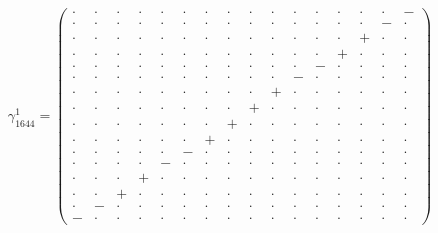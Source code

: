 \documentclass[
  10pt,
]{article}
\begin{document}
\[\gamma_{1644}^1=\left(\begin{smallmatrix} \cdot & \cdot & \cdot & \cdot & \cdot & \cdot & \cdot & \cdot & \cdot & \cdot & \cdot & \cdot & \cdot & \cdot & \cdot & - \\ \cdot & \cdot & \cdot & \cdot & \cdot & \cdot & \cdot & \cdot & \cdot & \cdot & \cdot & \cdot & \cdot & \cdot & - & \cdot \\ \cdot & \cdot & \cdot & \cdot & \cdot & \cdot & \cdot & \cdot & \cdot & \cdot & \cdot & \cdot & \cdot & + & \cdot & \cdot \\ \cdot & \cdot & \cdot & \cdot & \cdot & \cdot & \cdot & \cdot & \cdot & \cdot & \cdot & \cdot & + & \cdot & \cdot & \cdot \\ \cdot & \cdot & \cdot & \cdot & \cdot & \cdot & \cdot & \cdot & \cdot & \cdot & \cdot & - & \cdot & \cdot & \cdot & \cdot \\ \cdot & \cdot & \cdot & \cdot & \cdot & \cdot & \cdot & \cdot & \cdot & \cdot & - & \cdot & \cdot & \cdot & \cdot & \cdot \\ \cdot & \cdot & \cdot & \cdot & \cdot & \cdot & \cdot & \cdot & \cdot & + & \cdot & \cdot & \cdot & \cdot & \cdot & \cdot \\ \cdot & \cdot & \cdot & \cdot & \cdot & \cdot & \cdot & \cdot & + & \cdot & \cdot & \cdot & \cdot & \cdot & \cdot & \cdot \\ \cdot & \cdot & \cdot & \cdot & \cdot & \cdot & \cdot & + & \cdot & \cdot & \cdot & \cdot & \cdot & \cdot & \cdot & \cdot \\ \cdot & \cdot & \cdot & \cdot & \cdot & \cdot & + & \cdot & \cdot & \cdot & \cdot & \cdot & \cdot & \cdot & \cdot & \cdot \\ \cdot & \cdot & \cdot & \cdot & \cdot & - & \cdot & \cdot & \cdot & \cdot & \cdot & \cdot & \cdot & \cdot & \cdot & \cdot \\ \cdot & \cdot & \cdot & \cdot & - & \cdot & \cdot & \cdot & \cdot & \cdot & \cdot & \cdot & \cdot & \cdot & \cdot & \cdot \\ \cdot & \cdot & \cdot & + & \cdot & \cdot & \cdot & \cdot & \cdot & \cdot & \cdot & \cdot & \cdot & \cdot & \cdot & \cdot \\ \cdot & \cdot & + & \cdot & \cdot & \cdot & \cdot & \cdot & \cdot & \cdot & \cdot & \cdot & \cdot & \cdot & \cdot & \cdot \\ \cdot & - & \cdot & \cdot & \cdot & \cdot & \cdot & \cdot & \cdot & \cdot & \cdot & \cdot & \cdot & \cdot & \cdot & \cdot \\ - & \cdot & \cdot & \cdot & \cdot & \cdot & \cdot & \cdot & \cdot & \cdot & \cdot & \cdot & \cdot & \cdot & \cdot & \cdot \end{smallmatrix}\right)\]
\end{document}
